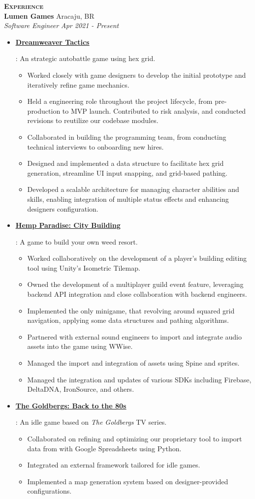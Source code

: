 \documentclass{article}
\newcommand{\resumeItem}[2]{
  \item{
    \textbf{#1}{: #2 \vspace{-5pt}}
  }
}
\newcommand{\simpleItem}[1]{
  \item{
    #1 \vspace{-3pt}
  }
}
\newcommand{\resumeSubheading}[4]{
  \noindent
  \textbf{#1} \dotfill #2 \\
  \resumeSubSubheading{#3}{#4}
}
\newcommand{\resumeSubSubheading}[2]{
    \noindent
    \vspace{5pt}
    \textit{#1} \dotfill \textit{ #2} \\
}
\newcommand{\resumeSubHeadingListStart}{\vspace{-10pt}\begin{itemize}}
\newcommand{\resumeSubHeadingListEnd}{\end{itemize}}
\newcommand{\resumeSubItemListStart}{\vspace{-5pt}\begin{itemize}}
\newcommand{\resumeSubItemListEnd}{\end{itemize}}
\newcommand{\resumeSection}[1]{
  \vspace{5pt}
    {\Large\textbf{\textsc{#1}}} \\
}
\begin{document}
\resumeSection{Experience}
    \resumeSubheading
      {Lumen Games}{Aracaju, BR}
      {Software Engineer}{Apr 2021 - Present}
      \resumeSubHeadingListStart
        \resumeItem
          {\href{https://play.google.com/store/apps/details?id=games.lumen.homatales}{\color{blue}\underline{Dreamweaver Tactics}}}
          {An strategic autobattle game using hex grid.
            \resumeSubItemListStart
              \simpleItem{Worked closely with game designers to develop the initial prototype and iteratively refine game mechanics.}
              \simpleItem{Held a engineering role throughout the project lifecycle, from pre-production to MVP launch. Contributed to risk analysis, and conducted revisions to reutilize our codebase modules.}
              \simpleItem{Collaborated in building the programming team, from conducting technical interviews to onboarding new hires.}
              \simpleItem{Designed and implemented a data structure to facilitate hex grid generation, streamline UI input snapping, and grid-based pathing.}
              \simpleItem{Developed a scalable architecture for managing character abilities and skills, enabling integration of multiple status effects and enhancing designers configuration.}
            \resumeSubItemListEnd
          }
        \resumeItem
          {\href{https://play.google.com/store/apps/details?id=games.redhood.hempparadise}{\color{blue}\underline{Hemp Paradise: City Building}}}
          {A game to build your own weed resort.
            \resumeSubItemListStart
              \simpleItem{Worked collaboratively on the development of a player's building editing tool using Unity's Isometric Tilemap.}
              \simpleItem{Owned the development of a multiplayer guild event feature, leveraging backend API integration and close collaboration with backend engineers.}
              \simpleItem{Implemented the only minigame, that revolving around squared grid navigation, applying some data structures and pathing algorithms.}
              \simpleItem{Partnered with external sound engineers to import and integrate audio assets into the game using WWise.}
              \simpleItem{Managed the import and integration of assets using Spine and sprites.}
              \simpleItem{Managed the integration and updates of various SDKs including Firebase, DeltaDNA, IronSource, and others.}
            \resumeSubItemListEnd
          }
        \resumeItem
          {\href{https://play.google.com/store/apps/details?id=com.eastsidegames.thegoldbergs}{\color{blue}\underline{The Goldbergs: Back to the 80s}}}
          {An idle game based on \textit{The Goldbergs} TV series.
            \resumeSubItemListStart
              \simpleItem{Collaborated on refining and optimizing our proprietary tool to import data from with Google Spreadsheets using Python.}
              \simpleItem{Integrated an external framework tailored for idle games.}
              \simpleItem{Implemented a map generation system based on designer-provided configurations.}
            \resumeSubItemListEnd
          }
      \resumeSubHeadingListEnd
\end{document}
